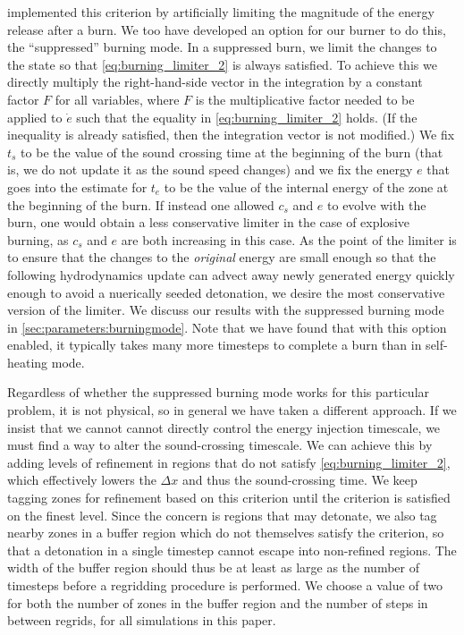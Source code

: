 \documentclass[twocolumn,numberedappendix]{../aastex6}
\begin{document}
\citet{kushnir:2013} implemented this criterion by artificially 
limiting the magnitude of the energy release after a burn. We
too have developed an option for our burner to do this,
the ``suppressed'' burning mode. In a suppressed burn, we limit
the changes to the state so that \autoref{eq:burning_limiter_2}
is always satisfied. To achieve this we directly multiply the
right-hand-side vector in the integration by a constant factor $F$
for all variables, where $F$ is the multiplicative factor needed to
be applied to $\dot{e}$ such that the equality in \autoref{eq:burning_limiter_2}
holds. (If the inequality is already satisfied, then the integration
vector is not modified.) We fix $t_s$ to be the value of the sound
crossing time at the beginning of the burn (that is, we do not
update it as the sound speed changes) and we fix the energy $e$
that goes into the estimate for $t_e$ to be the value of the
internal energy of the zone at the beginning of the burn. If
instead one allowed $c_s$ and $e$ to evolve with the burn, one
would obtain a less conservative limiter in the case of explosive
burning, as $c_s$ and $e$ are both increasing in this case.
As the point of the limiter is to ensure that the changes to the
\textit{original} energy are small enough so that the following
hydrodynamics update can advect away newly generated energy
quickly enough to avoid a nuerically seeded detonation,
we desire the most conservative version of the limiter. We discuss
our results with the suppressed burning mode in \autoref{sec:parameters:burningmode}.
Note that we have found that with this option enabled, it typically takes
many more timesteps to complete a burn than in self-heating mode.

Regardless of whether the suppressed burning mode works for this
particular problem, it is not physical, so in general we have
taken a different approach. If we insist that we cannot
cannot directly control the energy injection timescale, we 
must find a way to alter the sound-crossing timescale. 
We can achieve this by adding levels of refinement in 
regions that do not satisfy \autoref{eq:burning_limiter_2},
which effectively lowers the $\Delta x$ and thus the
sound-crossing time. We keep tagging zones for refinement
based on this criterion until the criterion is satisfied
on the finest level. Since the concern is regions that 
may detonate, we also tag nearby zones in a buffer region
which do not themselves satisfy the criterion,
so that a detonation in a single timestep cannot 
escape into non-refined regions. The width of the buffer 
region should thus be at least as large as the number of 
timesteps before a regridding procedure is performed.
We choose a value of two for both the number of zones in the 
buffer region and the number of steps in between regrids,
for all simulations in this paper.
\end{document}
